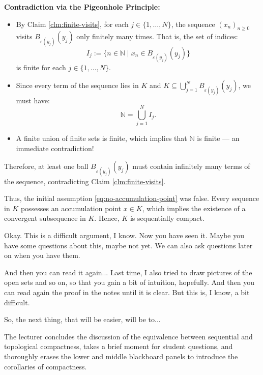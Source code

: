 \begin{proofWrapper}
\begin{content}
\textbf{Contradiction via the Pigeonhole Principle:}
\begin{itemize}
    \item By Claim \ref{clm:finite-visits}, for each $j \in \{1, \dots, N\}$, the sequence $(x_n)_{n \ge 0}$ visits $B_{\varepsilon(y_j)}(y_j)$ only finitely many times. That is, the set of indices:
    \[
    I_j := \bigl\{ n \in \mathbb{N} \;\big|\; x_n \in B_{\varepsilon(y_j)}(y_j) \bigr\}
    \]
    is finite for each $j \in \{1, \dots, N\}$.
    \item Since every term of the sequence lies in $K$ and $K \subseteq \bigcup_{j=1}^N B_{\varepsilon(y_j)}(y_j)$, we must have:
    \[
    \mathbb{N} = \bigcup_{j=1}^N I_j.
    \]
    \item A finite union of finite sets is finite, which implies that $\mathbb{N}$ is finite --- an immediate contradiction!
\end{itemize}
Therefore, at least one ball $B_{\varepsilon(y_j)}(y_j)$ must contain infinitely many terms of the sequence, contradicting Claim \ref{clm:finite-visits}.

Thus, the initial assumption \eqref{eq:no-accumulation-point} was false. Every sequence in $K$ possesses an accumulation point $x \in K$, which implies the existence of a convergent subsequence in $K$. Hence, $K$ is sequentially compact.
\end{content}

\end{proofWrapper}

\begin{speech}[00:19:00 - 00:20:50]
Okay. This is a difficult argument, I know. Now you have seen it. Maybe you have some questions about this, maybe not yet. We can also ask questions later on when you have them.

And then you can read it again... Last time, I also tried to draw pictures of the open sets and so on, so that you gain a bit of intuition, hopefully. And then you can read again the proof in the notes until it is clear. But this is, I know, a bit difficult.

So, the next thing, that will be easier, will be to... 
\end{speech}

\begin{note}
The lecturer concludes the discussion of the equivalence between sequential and topological compactness, takes a brief moment for student questions, and thoroughly erases the lower and middle blackboard panels to introduce the corollaries of compactness.
\end{note}

